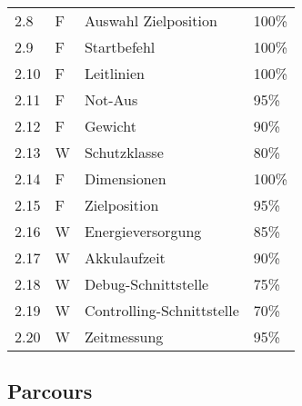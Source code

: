 \documentclass[main.tex]{subfiles} %
\begin{document}
\begin{tabular}{|l|p{0.5cm}|p{4cm}|p{10cm}|}
  2.8          & F              & Auswahl Zielposition         & 100\%                   \\
  2.9          & F              & Startbefehl                  & 100\%                   \\
  2.10         & F              & Leitlinien                   & 100\%                   \\
  2.11         & F              & Not-Aus                      & 95\%                    \\
  2.12         & F              & Gewicht                      & 90\%                    \\
  2.13         & W              & Schutzklasse                 & 80\%                    \\
  2.14         & F              & Dimensionen                  & 100\%                   \\
  2.15         & F              & Zielposition                 & 95\%                    \\
  2.16         & W              & Energieversorgung            & 85\%                    \\
  2.17         & W              & Akkulaufzeit                 & 90\%                    \\
  2.18         & W              & Debug-Schnittstelle          & 75\%                    \\
  2.19         & W              & Controlling-Schnittstelle    & 70\%                    \\
  2.20         & W              & Zeitmessung                  & 95\%                    \\
  \hline
\end{tabular}

\subsection*{Parcours}
\end{document}

